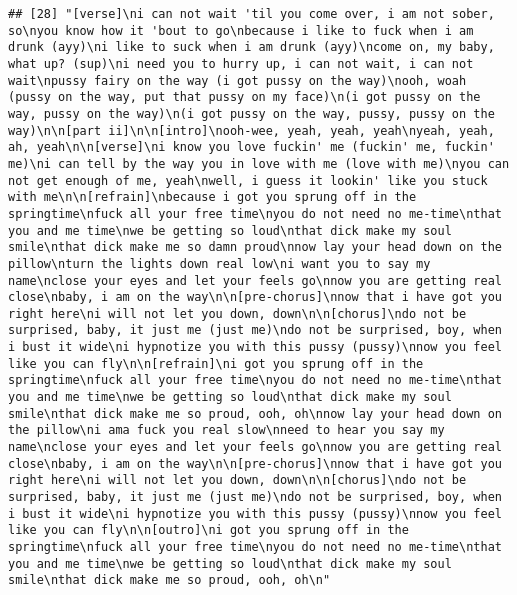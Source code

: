 \documentclass[]{article}
\begin{document}
\begin{verbatim}
## [28] "[verse]\ni can not wait 'til you come over, i am not sober, so\nyou know how it 'bout to go\nbecause i like to fuck when i am drunk (ayy)\ni like to suck when i am drunk (ayy)\ncome on, my baby, what up? (sup)\ni need you to hurry up, i can not wait, i can not wait\npussy fairy on the way (i got pussy on the way)\nooh, woah (pussy on the way, put that pussy on my face)\n(i got pussy on the way, pussy on the way)\n(i got pussy on the way, pussy, pussy on the way)\n\n[part ii]\n\n[intro]\nooh-wee, yeah, yeah, yeah\nyeah, yeah, ah, yeah\n\n[verse]\ni know you love fuckin' me (fuckin' me, fuckin' me)\ni can tell by the way you in love with me (love with me)\nyou can not get enough of me, yeah\nwell, i guess it lookin' like you stuck with me\n\n[refrain]\nbecause i got you sprung off in the springtime\nfuck all your free time\nyou do not need no me-time\nthat you and me time\nwe be getting so loud\nthat dick make my soul smile\nthat dick make me so damn proud\nnow lay your head down on the pillow\nturn the lights down real low\ni want you to say my name\nclose your eyes and let your feels go\nnow you are getting real close\nbaby, i am on the way\n\n[pre-chorus]\nnow that i have got you right here\ni will not let you down, down\n\n[chorus]\ndo not be surprised, baby, it just me (just me)\ndo not be surprised, boy, when i bust it wide\ni hypnotize you with this pussy (pussy)\nnow you feel like you can fly\n\n[refrain]\ni got you sprung off in the springtime\nfuck all your free time\nyou do not need no me-time\nthat you and me time\nwe be getting so loud\nthat dick make my soul smile\nthat dick make me so proud, ooh, oh\nnow lay your head down on the pillow\ni ama fuck you real slow\nneed to hear you say my name\nclose your eyes and let your feels go\nnow you are getting real close\nbaby, i am on the way\n\n[pre-chorus]\nnow that i have got you right here\ni will not let you down, down\n\n[chorus]\ndo not be surprised, baby, it just me (just me)\ndo not be surprised, boy, when i bust it wide\ni hypnotize you with this pussy (pussy)\nnow you feel like you can fly\n\n[outro]\ni got you sprung off in the springtime\nfuck all your free time\nyou do not need no me-time\nthat you and me time\nwe be getting so loud\nthat dick make my soul smile\nthat dick make me so proud, ooh, oh\n"                                                                                                                                                                                                                                                                                                                                                                                                                                                                                                                                                                                                                                                                                                                                                                                                                                                                                                                                                                                                                                         
\end{verbatim}
\end{document}
